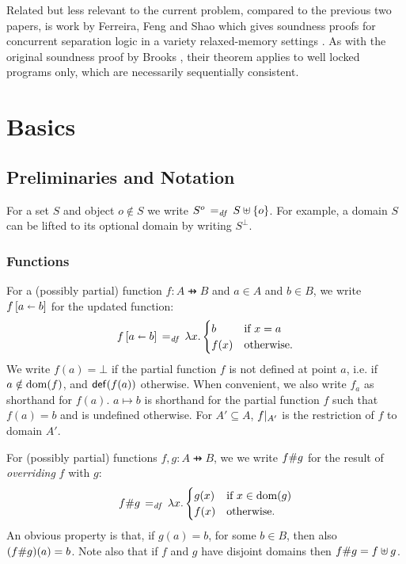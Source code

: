 \documentclass[11pt]{article}
\begin{document}
Related but less relevant to the current problem, compared to the previous two papers, is work by Ferreira, Feng and Shao which gives soundness proofs for concurrent separation logic in a variety relaxed-memory settings \cite{DBLP:conf/esop/FerreiraFS10}. As with the original soundness proof by Brooks \cite{DBLP:journals/tcs/Brookes07}, their theorem applies to well locked programs only, which are necessarily sequentially consistent. 

\section{Basics}

\subsection{Preliminaries and Notation}

For a set $S$ and object $o \notin S$ we write $S^o \operatorname{\;=_{\mathit{df}}\;} S \uplus \left\lbrace o \right\rbrace$. For example, a domain $S$ can be lifted to its optional domain by writing $S^\bot$. 

\subsubsection{Functions}
\label{sec:functions}

For a (possibly partial) function $f : A \pfun B$ and $a \in A$ and $b \in B$, we write $f \left[ a \shortleftarrow b \right]$ for the updated function: \[ f \left[ a \shortleftarrow b \right] \operatorname{\;=_{\mathit{df}}\;} \lambda x . \begin{cases}
	b & \text{if $x = a$} \\
	f(x) & \text{otherwise.}
\end{cases}\] We write $f(a) = \bot$ if the partial function $f$ is not defined at point $a$, i.e. if $a \notin \operatorname{\mathrm{dom}}(f)$, and $\mathsf{def}(f(a))$ otherwise. When convenient, we also write $f_a$ as shorthand for $f(a)$. $a \mapsto b$ is shorthand for the partial function $f$ such that $f(a) = b$ and is undefined otherwise. For $A' \subseteq A$, $f |_{A'}$ is the restriction of $f$ to domain $A'$. 

For (possibly partial) functions $f,g : A \pfun B$, we we write $f \# g$ for the result of \emph{overriding} $f$ with $g$: \[ f \# g \operatorname{\;=_{\mathit{df}}\;} \lambda x . \begin{cases}
	g(x) & \text{if $x \in \operatorname{\mathrm{dom}}(g)$} \\
	f(x) & \text{otherwise.}
\end{cases} \] An obvious property is that, if $g(a) = b$, for some $b \in B$, then also $(f \# g)(a) = b$. Note also that if $f$ and $g$ have disjoint domains then $f \# g = f \uplus g$. 
\end{document}
